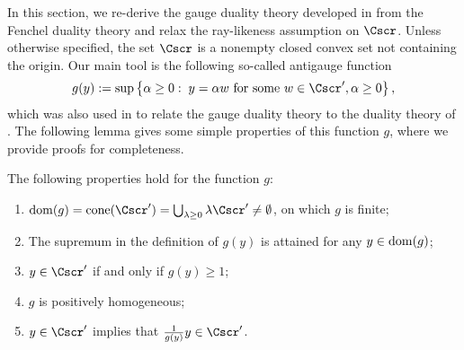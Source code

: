 \documentclass{siamltex}   %
\begin{document}
In this section, we re-derive the gauge duality theory developed in \cite{freund:1987} from the
Fenchel duality theory and relax the ray-likeness assumption on $\Cscr$.
Unless otherwise specified, the set $\Cscr$ is a nonempty closed convex set not containing the origin.
Our main tool is the following so-called antigauge function
  \begin{equation}\label{defg}
    g(y) := \sup\left\{\alpha \ge 0:\; y = \alpha w \mbox{ for some }w\in \Cscr', \alpha \ge 0\right\},
  \end{equation}
  which was also used in  \cite{freund:1987} to relate the gauge duality theory to the duality theory of \cite{Gwinner:1985}.
  The following lemma gives some simple properties of this function $g$, where we provide proofs for completeness.
  \begin{lemma}\label{sec4:lem0}
    The following properties hold for the function $g$:
    \begin{enumerate}[{\rm (i)}]
      \item ${\rm dom}(g) = {\rm cone}(\Cscr') = \bigcup_{\lambda\ge 0}\lambda \Cscr'\neq \emptyset$, on which $g$ is finite;
      \item The supremum in the definition of $g(y)$ is attained for any $y\in {\rm dom}(g)$;
      \item $y\in \Cscr'$ if and only if $g(y)\ge 1$;
      \item $g$ is positively homogeneous;
      \item $y\in \Cscr'$ implies that $\frac{1}{g(y)}y\in \Cscr'$.
    \end{enumerate}
  \end{lemma}
\end{document}
